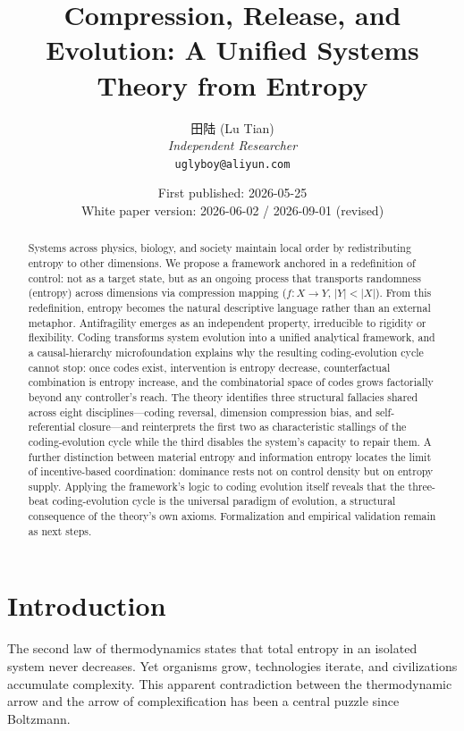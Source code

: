 \documentclass[11pt,a4paper]{article}
\title{\textbf{Compression, Release, and Evolution: A Unified Systems Theory from Entropy}}
\author{
    田陆 (Lu Tian)\\
    \textit{Independent Researcher}\\
    \texttt{uglyboy@aliyun.com}
}
\date{First published: 2026-05-25\\White paper version: 2026-06-02 / 2026-09-01 (revised)}
\begin{document}
\maketitle

\begin{abstract}
\noindent Systems across physics, biology, and society maintain local order by redistributing entropy to other dimensions. We propose a framework anchored in a redefinition of control: not as a target state, but as an ongoing process that transports randomness (entropy) across dimensions via compression mapping ($f: X \rightarrow Y$, $|Y| < |X|$). From this redefinition, entropy becomes the natural descriptive language rather than an external metaphor. Antifragility emerges as an independent property, irreducible to rigidity or flexibility. Coding transforms system evolution into a unified analytical framework, and a causal-hierarchy microfoundation explains why the resulting coding-evolution cycle cannot stop: once codes exist, intervention is entropy decrease, counterfactual combination is entropy increase, and the combinatorial space of codes grows factorially beyond any controller's reach. The theory identifies three structural fallacies shared across eight disciplines---coding reversal, dimension compression bias, and self-referential closure---and reinterprets the first two as characteristic stallings of the coding-evolution cycle while the third disables the system's capacity to repair them. A further distinction between material entropy and information entropy locates the limit of incentive-based coordination: dominance rests not on control density but on entropy supply. Applying the framework's logic to coding evolution itself reveals that the three-beat coding-evolution cycle is the universal paradigm of evolution, a structural consequence of the theory's own axioms. Formalization and empirical validation remain as next steps.
\end{abstract}

\vspace{0.5cm}

\section{Introduction}

The second law of thermodynamics states that total entropy in an isolated system never decreases. Yet organisms grow, technologies iterate, and civilizations accumulate complexity. This apparent contradiction between the thermodynamic arrow and the arrow of complexification has been a central puzzle since Boltzmann.
\end{document}
